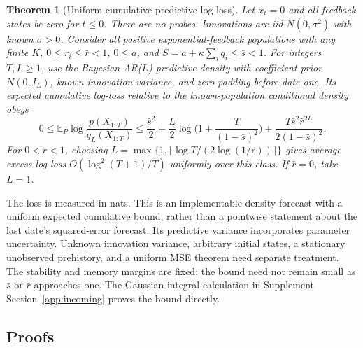\documentclass[12pt]{article}
\newtheorem{theorem}{Theorem}[section]
\theoremstyle{definition}
\theoremstyle{remark}
\begin{document}
\begin{theorem}[Uniform cumulative predictive log-loss]\label{n:uniformlog}
Let $x_t=0$ and all feedback states be zero for $t\le0$. There are no probes. Innovations are iid $N(0,\sigma^2)$ with known $\sigma>0$. Consider all positive exponential-feedback populations with any finite $K$, $0\le r_i\le\bar r<1$, $0\le a$, and $S=a+\kappa\sum_iq_i\le\bar s<1$. For integers $T,L\ge1$, use the Bayesian AR($L$) predictive density with coefficient prior $N(0,I_L)$, known innovation variance, and zero padding before date one. Its expected cumulative log-loss relative to the known-population conditional density obeys
\[
0\le\mathbb E_P\log\frac{p(X_{1:T})}{q_L(X_{1:T})}
\le\frac{\bar s^2}{2}+\frac L2\log\Big(1+\frac{T}{(1-\bar s)^2}\Big)
+\frac{T\bar s^2\bar r^{2L}}{2(1-\bar s)^2}.
\]
For $0<\bar r<1$, choosing $L=\max\{1,\lceil\log T/(2\log(1/\bar r))\rceil\}$ gives average excess log-loss $O(\log^2(T+1)/T)$ uniformly over this class. If $\bar r=0$, take $L=1$.
\end{theorem}

The loss is measured in nats. This is an implementable density forecast with a uniform expected cumulative bound, rather than a pointwise statement about the last date's squared-error forecast. Its predictive variance incorporates parameter uncertainty. Unknown innovation variance, arbitrary initial states, a stationary unobserved prehistory, and a uniform MSE theorem need separate treatment. The stability and memory margins are fixed; the bound need not remain small as $\bar s$ or $\bar r$ approaches one. The Gaussian integral calculation in Supplement Section~\ref{app:incoming} proves the bound directly.

\subsection{Proofs}
\end{document}
